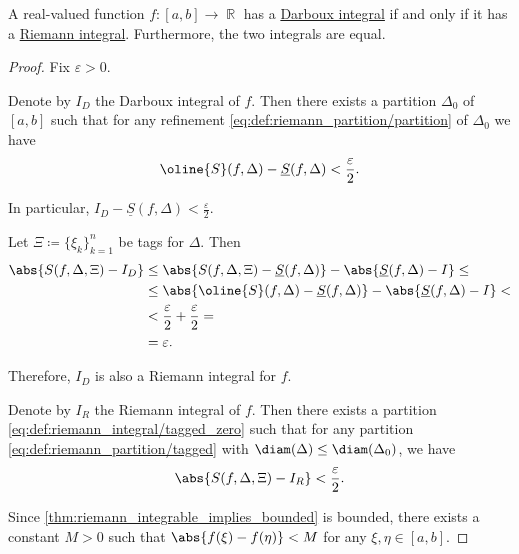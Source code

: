 \begin{proposition}\label{thm:darboux_integral_iff_riemann_integral}
  A real-valued function \( f: [a, b] \to \BbbR \) has a \hyperref[def:darboux_integral]{Darboux integral} if and only if it has a \hyperref[def:riemann_integral]{Riemann integral}. Furthermore, the two integrals are equal.
\end{proposition}
\begin{proof}
  Fix \( \varepsilon > 0 \).

   Denote by \( I_D \) the Darboux integral of \( f \). Then there exists a partition \( \Delta_0 \) of \( [a, b] \) such that for any refinement \eqref{eq:def:riemann_partition/partition} of \( \Delta_0 \) we have
  \begin{equation*}
    \oline{S}(f, \Delta) - \underline{S}(f, \Delta) < \frac \varepsilon 2.
  \end{equation*}

  In particular, \( I_D - \underline{S}(f, \Delta) < \tfrac \varepsilon 2 \).

  Let \( \Xi \coloneqq \{ \xi_k \}_{k=1}^n \) be tags for \( \Delta \). Then
  \begin{align*}
    \abs{S(f, \Delta, \Xi) - I_D}
    &\leq
    \abs{S(f, \Delta, \Xi) - \underline{S}(f, \Delta)} - \abs{\underline{S}(f, \Delta) - I}
    \leq \\ &\leq
    \abs{\oline{S}(f, \Delta) - \underline{S}(f, \Delta)} - \abs{\underline{S}(f, \Delta) - I}
    < \\ &<
    \frac \varepsilon 2 + \frac \varepsilon 2
    = \\ &=
    \varepsilon.
  \end{align*}

  Therefore, \( I_D \) is also a Riemann integral for \( f \).

   Denote by \( I_R \) the Riemann integral of \( f \). Then there exists a partition \eqref{eq:def:riemann_integral/tagged_zero} such that for any partition \eqref{eq:def:riemann_partition/tagged} with \( \diam(\Delta) \leq \diam(\Delta_0) \), we have
  \begin{equation*}
    \abs{S(f, \Delta, \Xi) - I_R} < \frac \varepsilon 2.
  \end{equation*}

  Since \eqref{thm:riemann_integrable_implies_bounded} is bounded, there exists a constant \( M > 0 \) such that \( \abs{f(\xi) - f(\eta)} < M \) for any \( \xi, \eta \in [a, b] \).


\end{proof}
